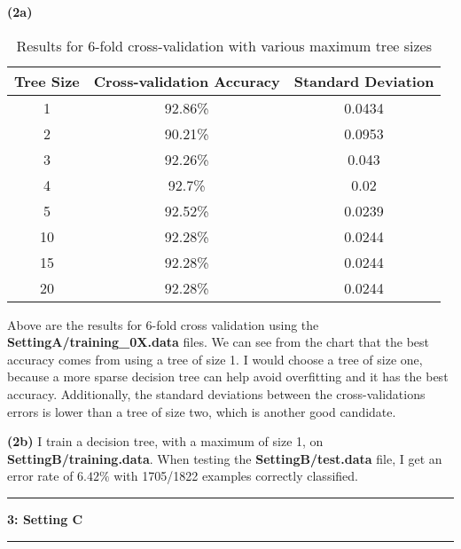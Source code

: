 \documentclass[11pt]{article}
\newcommand\question[2]{\vspace{.25in}\hrule\textbf{#1: #2}\vspace{.5em}\hrule\vspace{.10in}}
\renewcommand\part[1]{\vspace{.10in}\textbf{(#1)}}
\begin{document}

\part{2a}
\begin{table}[H]
\centering
\begin{tabular}{| c | c | c |}
\hline
Tree Size& Cross-validation Accuracy & Standard Deviation\\
\hline
1 & 92.86\% & 0.0434\\
2 & 90.21\% & 0.0953\\
3 & 92.26\% & 0.043\\
4 & 92.7\% & 0.02\\
5 & 92.52\% & 0.0239\\
10 & 92.28\% & 0.0244\\
15 & 92.28\% & 0.0244\\
20 & 92.28\% & 0.0244\\
\hline
\end{tabular}
\caption{Results for 6-fold cross-validation with various maximum tree sizes}
\end{table}
Above are the results for 6-fold cross validation using the \textbf{SettingA/training\_0X.data} files. We can see from the chart that the best accuracy comes from using a tree of size 1. I would choose a tree of size one, because a more sparse decision tree can help avoid overfitting and it has the best accuracy. Additionally, the standard deviations between the cross-validations errors is lower than a tree of size two, which is another good candidate.


\part{2b} I train a decision tree, with a maximum of size 1, on \textbf{SettingB/training.data}. When testing the \textbf{SettingB/test.data} file, I get an error rate of $6.42\%$ with 1705/1822 examples correctly classified.

\newpage

\question{3}{Setting C}
\end{document}
